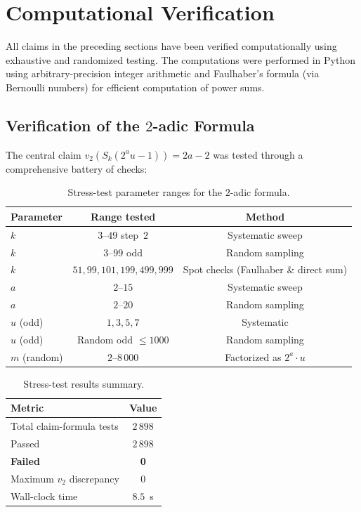 \documentclass[12pt,a4paper]{article}
\theoremstyle{plain}
\theoremstyle{definition}
\begin{document}
\bigskip
\section{Computational Verification}
\label{sec:compute}

All claims in the preceding sections have been verified computationally
using exhaustive and randomized testing.  The computations were performed
in Python using arbitrary-precision integer arithmetic and Faulhaber's
formula (via Bernoulli numbers) for efficient computation of power sums.

\subsection{Verification of the $2$-adic Formula}

The central claim $v_2(S_k(2^a u - 1)) = 2a - 2$ was tested through a
comprehensive battery of checks:

\begin{table}[htbp]
\centering
\caption{Stress-test parameter ranges for the $2$-adic formula.}
\label{tab:stress}
\begin{tabular}{lcc}
\toprule
\textbf{Parameter} & \textbf{Range tested} & \textbf{Method} \\
\midrule
$k$ & $3$--$49$ step~$2$ & Systematic sweep \\
$k$ & $3$--$99$ odd & Random sampling \\
$k$ & $51, 99, 101, 199, 499, 999$ & Spot checks (Faulhaber \& direct sum) \\
$a$ & $2$--$15$ & Systematic sweep \\
$a$ & $2$--$20$ & Random sampling \\
$u$ (odd) & $1, 3, 5, 7$ & Systematic \\
$u$ (odd) & Random odd $\le 1000$ & Random sampling \\
$m$ (random) & $2$--$8\,000$ & Factorized as $2^a \cdot u$ \\
\bottomrule
\end{tabular}
\end{table}

\begin{table}[htbp]
\centering
\caption{Stress-test results summary.}
\label{tab:stress-results}
\begin{tabular}{lc}
\toprule
\textbf{Metric} & \textbf{Value} \\
\midrule
Total claim-formula tests & $2\,898$ \\
Passed & $2\,898$ \\
\textbf{Failed} & \textbf{0} \\
Maximum $v_2$ discrepancy & $0$ \\
Wall-clock time & $8.5$~s \\
\bottomrule
\end{tabular}
\end{table}
\end{document}
